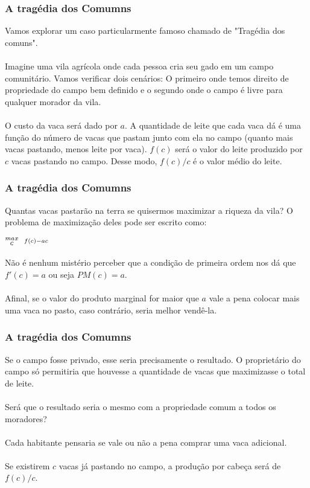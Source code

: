 \documentclass{beamer}[10]
\begin{document}
\begin{frame}
	\frametitle{A tragédia dos Comumns}

	Vamos explorar um caso particularmente famoso chamado de "Tragédia dos comuns".
	\\~\\
	Imagine uma vila agrícola onde cada pessoa cria seu gado em um campo comunitário. Vamos verificar dois cenários: O primeiro onde temos direito de propriedade do campo bem definido e o segundo onde o campo é livre para qualquer morador da vila.
	\\~\\
	O custo da vaca será dado por $a$. A quantidade de leite que cada vaca dá é uma função do número de vacas que pastam junto com ela no campo (quanto mais vacas pastando, menos leite por vaca). $f(c)$ será o valor do leite produzido por $c$ vacas pastando no campo. Desse modo, $f(c)/c$ é o valor médio do leite.

\end{frame}

\begin{frame}
	\frametitle{A tragédia dos Comumns}

	Quantas vacas pastarão na terra se quisermos maximizar a riqueza da vila? O problema de maximização deles pode ser escrito como:

	\begin{center}
		\LARGE $ \stackrel{max}{\text{\small $c$}} \ \ %
		\stackrel{f(c) - ac}{\ } $ %
	\end{center}

	Não é nenhum mistério perceber que a condição de primeira ordem nos dá que $f'(c) = a$ ou seja $PM(c) = a$.
	\\~\\
	Afinal, se o valor do produto marginal for maior que $a$ vale a pena colocar mais uma vaca no pasto, caso contrário, seria melhor vendê-la.

\end{frame}

\begin{frame}
	\frametitle{A tragédia dos Comumns}

	Se o campo fosse privado, esse seria precisamente o resultado. O proprietário do campo só permitiria que houvesse a quantidade de vacas que maximizasse o total de leite.
	\\~\\
	Será que o resultado seria o mesmo com a propriedade comum a todos os moradores?
	\\~\\
	Cada habitante pensaria se vale ou não a pena comprar uma vaca adicional.
	\\~\\
	Se existirem $c$ vacas já pastando no campo, a produção por cabeça será de $f(c)/c$.

\end{frame}
\end{document}
